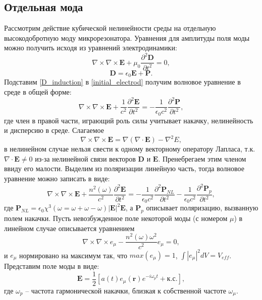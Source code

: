\subsection{Отдельная мода}
Рассмотрим действие кубической нелинейности среды на отдельную высокодобротную моду микрорезонатора. Уравнения для амплитуды поля моды можно получить исходя из уравнений электродинамики:
\begin{equation}\label{initial_electrod}
\nabla\times\nabla\times\textbf{E}+\mu_0\frac{\partial^2\textbf{D}}{\partial t^2}=0,
\end{equation}
\begin{equation}\label{D_induction}
\textbf{D}=\epsilon_0\textbf{E}+\textbf{P}.
\end{equation}
Подставим \eqref{D_induction} в \eqref{initial_electrod} получим волновое уравнение в среде в общей форме:
\begin{equation}
\nabla\times\nabla\times\textbf{E}+\frac{1}{c^2}\frac{\partial^2\textbf{E}}{\partial t^2}=-\frac{1}{\epsilon_0c^2}\frac{\partial^2\textbf{P}}{\partial t^2},
\end{equation}
где член в правой части, играющий роль силы учитывает накачку, нелинейность и дисперсию в среде.
Слагаемое
\begin{equation}
\nabla\times\nabla\times\textbf{E}=\nabla(\nabla\cdot \textbf{E})-\nabla^2E,
\end{equation}
в нелинейном случае нельзя свести к одному векторному оператору Лапласа, т.к. $\nabla\cdot\textbf{E}\neq0$ из-за нелинейной связи векторов $\textbf{D}$ и $\textbf{E}$. Пренебрегаем этим членом ввиду его малости. Выделим из поляризации линейную часть, тогда волновое уравнение можно записать в виде:
\begin{equation}\label{wave_eq_polarization}
\nabla\times\nabla\times\textbf{E}+\frac{n^2(\omega)}{c^2}\frac{\partial^2\textbf{E}}{\partial t^2} =-\frac{1}{\epsilon_0c^2}\frac{\partial^2\textbf{P}_{NL}}{\partial t^2}-\frac{1}{\epsilon_0c^2}\frac{\partial^2\textbf{P}_{p}}{\partial t^2},
\end{equation}
где $\textbf{P}_{NL}=\epsilon_0\chi^3(\omega=\omega+\omega-\omega)|\textbf{E}|^2\textbf{E}$, а $\textbf{P}_p$ описывает поляризацию, вызванную полем накачки.
Пусть невозбужденное поле некоторой моды (с номером $\mu$) в линейном случае описывается уравнением
\begin{equation}\label{Helmholz}
\nabla\times\nabla\times\textbf{$e_\mu$}-\frac{n^2(\omega)\omega^2}{c^2}\textbf{$e_\mu$}=0,
\end{equation}
и $e_\mu$ нормировано на максимум так, что $max(e_\mu)=1$, $\int|e_\mu|^2dV=V_{eff}$. Представим поле моды в виде:
\begin{equation}
\textbf{E}=\frac{1}{2}[a(t)\textbf{$e_\mu$}(\textbf{r})e^{-i\omega_pt}+\text{к.с.}],
\end{equation}
где $\omega_p$ -- частота гармонической накачки, близкая к собственной частоте $\omega_\mu$.

